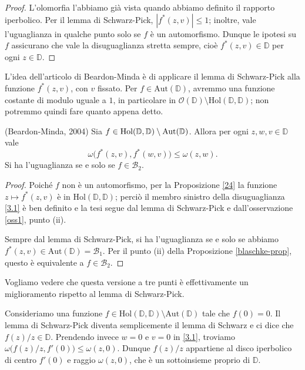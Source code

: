 \begin{proof}
  L'olomorfia l'abbiamo già vista quando abbiamo definito il rapporto iperbolico. Per il lemma di Schwarz-Pick, $|f^*(z,v)| \le 1$; inoltre, vale l'uguaglianza in qualche punto solo se $f$ è un automorfismo. Dunque le ipotesi su $f$ assicurano che vale la disuguaglianza stretta sempre, cioè $f^*(z,v) \in \mathbb{D}$ per ogni $z \in \mathbb{D}$.
\end{proof}

L'idea dell'articolo di Beardon-Minda è di applicare il lemma di Schwarz-Pick alla funzione $f^*(z,v)$, con $v$ fissato. Per $f \in \text{Aut}(\mathbb{D})$, avremmo una funzione costante di modulo uguale a $1$, in particolare in $\mathcal{O}(\mathbb{D})\setminus\text{Hol}(\mathbb{D},\mathbb{D})$; non potremmo quindi fare quanto appena detto.

\begin{thm} \label{31}
  (Beardon-Minda, 2004) Sia $f \in \text{\normalfont{Hol}}(\mathbb{D},\mathbb{D})\setminus\text{\normalfont{Aut}}(\mathbb{D})$. Allora per ogni $z, w, v \in \mathbb{D}$ vale
  \begin{equation} \label{3.1}
    \omega\bigl(f^*(z,v),f^*(w,v)\bigr) \le \omega(z,w).
  \end{equation}
  Si ha l'uguaglianza se e solo se $f \in \mathcal{B}_2$.
\end{thm}

\begin{proof}
  Poiché $f$ non è un automorfismo, per la Proposizione \ref{24} la funzione $z \longmapsto f^*(z,v)$ è in $\text{Hol}(\mathbb{D}, \mathbb{D})$; perciò il membro sinistro della disuguaglianza \eqref{3.1} è ben definito e la tesi segue dal lemma di Schwarz-Pick e dall'osservazione \ref{oss1}, punto (ii).

  Sempre dal lemma di Schwarz-Pick, si ha l'uguaglianza se e solo se abbiamo $f^*(z,v) \in \text{Aut}(\mathbb{D})=\mathcal{B}_1$. Per il punto (ii) della Proposizione \ref{blaschke-prop}, questo è equivalente a $f \in \mathcal{B}_2$.
\end{proof}

Vogliamo vedere che questa versione a tre punti è effettivamente un miglioramento rispetto al lemma di Schwarz-Pick.

\begin{ex}
  Consideriamo una funzione $f \in \text{Hol}(\mathbb{D},\mathbb{D})\setminus\text{Aut}(\mathbb{D})$ tale che $f(0)=0$. Il lemma di Schwarz-Pick diventa semplicemente il lemma di Schwarz e ci dice che $f(z)/z \in \mathbb{D}$. Prendendo invece $w=0$ e $v=0$ in \eqref{3.1}, troviamo $\omega\bigl(f(z)/z,f'(0)\bigr) \le \omega(z,0)$.
  Dunque $f(z)/z$ appartiene al disco iperbolico di centro $f'(0)$ e raggio $\omega(z,0)$, che è un sottoinsieme proprio di $\mathbb{D}$.
\end{ex}

